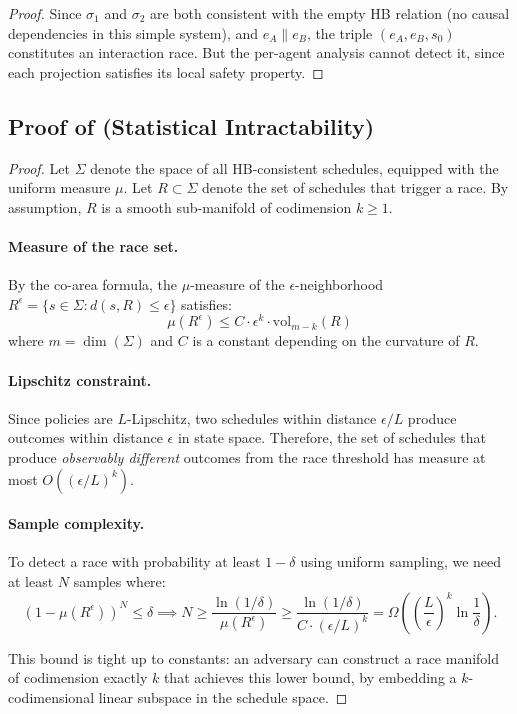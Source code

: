 \documentclass[11pt]{article}
\newcommand{\conc}{\parallel}
\begin{document}
\begin{proof}
Since $\sigma_1$ and $\sigma_2$ are both consistent with the empty HB
relation (no causal dependencies in this simple system), and $e_A \conc e_B$,
the triple $(e_A, e_B, s_0)$ constitutes an interaction race. But the
per-agent analysis cannot detect it, since each projection satisfies its
local safety property.
\end{proof}


\subsection{Proof of \texorpdfstring{}{Theorem 2.2} (Statistical Intractability)}

\begin{proof}
Let $\Sigma$ denote the space of all HB-consistent schedules, equipped with the
uniform measure $\mu$. Let $R \subset \Sigma$ denote the set of schedules that
trigger a race. By assumption, $R$ is a smooth sub-manifold of codimension
$k \geq 1$.

\paragraph{Measure of the race set.}
By the co-area formula, the $\mu$-measure of the $\epsilon$-neighborhood
$R^\epsilon = \{s \in \Sigma : d(s, R) \leq \epsilon\}$ satisfies:
\[
  \mu(R^\epsilon) \leq C \cdot \epsilon^k \cdot \mathrm{vol}_{m-k}(R)
\]
where $m = \dim(\Sigma)$ and $C$ is a constant depending on the curvature of $R$.

\paragraph{Lipschitz constraint.}
Since policies are $L$-Lipschitz, two schedules within distance $\epsilon/L$
produce outcomes within distance $\epsilon$ in state space. Therefore, the
set of schedules that produce \emph{observably different} outcomes from the
race threshold has measure at most $O((\epsilon/L)^k)$.

\paragraph{Sample complexity.}
To detect a race with probability at least $1 - \delta$ using uniform sampling,
we need at least $N$ samples where:
\[
  (1 - \mu(R^\epsilon))^N \leq \delta
  \implies N \geq \frac{\ln(1/\delta)}{\mu(R^\epsilon)}
  \geq \frac{\ln(1/\delta)}{C \cdot (\epsilon/L)^k}
  = \Omega\!\left(\left(\frac{L}{\epsilon}\right)^k \ln \frac{1}{\delta}\right).
\]

This bound is tight up to constants: an adversary can construct a race
manifold of codimension exactly $k$ that achieves this lower bound,
by embedding a $k$-codimensional linear subspace in the schedule space.
\end{proof}
\end{document}
